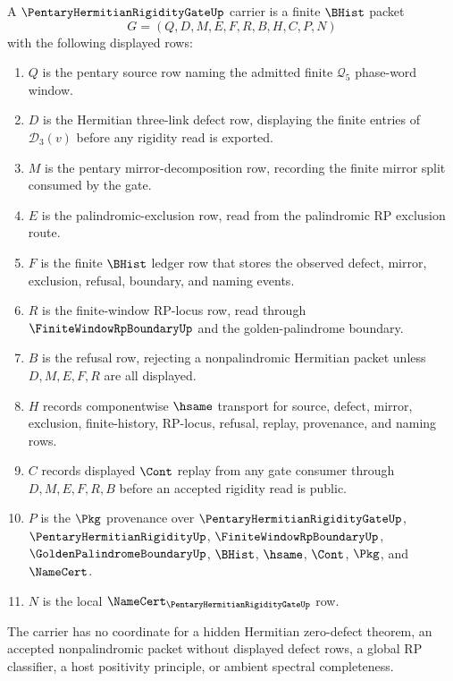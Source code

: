 \begin{definition}
\label{def:pentary-hermitian-rigidity-gate-carrier}
A $\PentaryHermitianRigidityGateUp$ carrier is a finite $\BHist$ packet
$$
G=(Q,D,M,E,F,R,B,H,C,P,N)
$$
with the following displayed rows:
\begin{enumerate}
\item $Q$ is the pentary source row naming the admitted finite $\mathcal Q_5$ phase-word window.
\item $D$ is the Hermitian three-link defect row, displaying the finite entries of $\mathcal D_3(v)$ before any rigidity read is exported.
\item $M$ is the pentary mirror-decomposition row, recording the finite mirror split consumed by the gate.
\item $E$ is the palindromic-exclusion row, read from the palindromic RP exclusion route.
\item $F$ is the finite $\BHist$ ledger row that stores the observed defect, mirror, exclusion, refusal, boundary, and naming events.
\item $R$ is the finite-window RP-locus row, read through $\FiniteWindowRpBoundaryUp$ and the golden-palindrome boundary.
\item $B$ is the refusal row, rejecting a nonpalindromic Hermitian packet unless $D,M,E,F,R$ are all displayed.
\item $H$ records componentwise $\hsame$ transport for source, defect, mirror, exclusion, finite-history, RP-locus, refusal, replay, provenance, and naming rows.
\item $C$ records displayed $\Cont$ replay from any gate consumer through $D,M,E,F,R,B$ before an accepted rigidity read is public.
\item $P$ is the $\Pkg$ provenance over $\PentaryHermitianRigidityGateUp$, $\PentaryHermitianRigidityUp$, $\FiniteWindowRpBoundaryUp$, $\GoldenPalindromeBoundaryUp$, $\BHist$, $\hsame$, $\Cont$, $\Pkg$, and $\NameCert$.
\item $N$ is the local $\NameCert_{\PentaryHermitianRigidityGateUp}$ row.
\end{enumerate}
The carrier has no coordinate for a hidden Hermitian zero-defect theorem, an accepted nonpalindromic packet without displayed defect rows, a global RP classifier, a host positivity principle, or ambient spectral completeness.
\end{definition}

